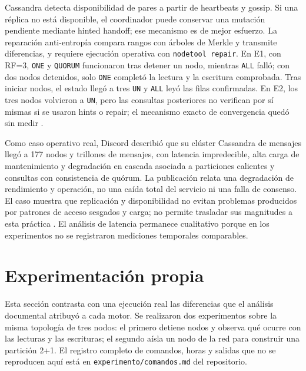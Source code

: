 \documentclass[11pt,a4paper]{article}
\begin{document}
Cassandra detecta disponibilidad de pares a partir de heartbeats y gossip. Si una réplica no está disponible, el coordinador puede conservar una mutación pendiente mediante hinted handoff; ese mecanismo es de mejor esfuerzo. La reparación anti-entropía compara rangos con árboles de Merkle y transmite diferencias, y requiere ejecución operativa con \texttt{nodetool repair}. En E1, con RF=3, \texttt{ONE} y \texttt{QUORUM} funcionaron tras detener un nodo, mientras \texttt{ALL} falló; con dos nodos detenidos, solo \texttt{ONE} completó la lectura y la escritura comprobada. Tras iniciar nodos, el estado llegó a tres \texttt{UN} y \texttt{ALL} leyó las filas confirmadas. En E2, los tres nodos volvieron a \texttt{UN}, pero las consultas posteriores no verifican por sí mismas si se usaron hints o repair; el mecanismo exacto de convergencia quedó sin medir \cite{apacheCassandraDynamo,apacheCassandraRepair,apacheCassandraGuarantees}.

Como caso operativo real, Discord describió que su clúster Cassandra de mensajes llegó a 177 nodos y trillones de mensajes, con latencia impredecible, alta carga de mantenimiento y degradación en cascada asociada a particiones calientes y consultas con consistencia de quórum. La publicación relata una degradación de rendimiento y operación, no una caída total del servicio ni una falla de consenso. El caso muestra que replicación y disponibilidad no evitan problemas producidos por patrones de acceso sesgados y carga; no permite trasladar sus magnitudes a esta práctica \cite{discord2023cassandra}. El análisis de latencia permanece cualitativo porque en los experimentos no se registraron mediciones temporales comparables.

\section{Experimentación propia}

Esta sección contrasta con una ejecución real las diferencias que el análisis
documental atribuyó a cada motor. Se realizaron dos experimentos sobre la misma
topología de tres nodos: el primero detiene nodos y observa qué ocurre con las
lecturas y las escrituras; el segundo aísla un nodo de la red para construir una
partición 2+1. El registro completo de comandos, horas y salidas que no se
reproducen aquí está en \texttt{experimento/comandos.md} del repositorio.
\end{document}
